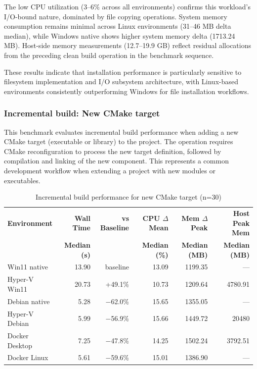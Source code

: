 The low CPU utilization (3--6\% across all environments) confirms this workload's I/O-bound nature, dominated by file copying operations.
System memory consumption remains minimal across Linux environments (31--46 MB delta median), while Windows native shows higher system memory delta (1713.24 MB).
Host-side memory measurements (12.7--19.9 GB) reflect residual allocations from the preceding clean build operation in the benchmark sequence.

These results indicate that installation performance is particularly sensitive to filesystem implementation and I/O subsystem architecture, with Linux-based environments consistently outperforming Windows for file installation workflows.

\subsubsection{Incremental build: New CMake target}
\label{subsec:incremental_new_target}

This benchmark evaluates incremental build performance when adding a new CMake target (executable or library) to the project.
The operation requires CMake reconfiguration to process the new target definition, followed by compilation and linking of the new component.
This represents a common development workflow when extending a project with new modules or executables.

\begin{table}[ht]
    \centering
    \footnotesize
    \begin{tabular}{|l|r|r|r|r|r|}
        \hline
        \textbf{Environment} & \textbf{Wall Time} & \textbf{vs Baseline} & \textbf{CPU $\Delta$ Mean} & \textbf{Mem $\Delta$ Peak} & \textbf{Host Peak Mem} \\
        & \textbf{Median (s)} & & \textbf{Median (\%)} & \textbf{Median (MB)} & \textbf{Median (MB)} \\
        \hline
        Win11 native & 13.90 & baseline & 13.09 & 1199.35 & --- \\
        Hyper-V Win11 & 20.73 & +49.1\% & 10.73 & 1209.64 & 4780.91 \\
        Debian native & 5.28 & $-$62.0\% & 15.65 & 1355.05 & --- \\
        Hyper-V Debian & 5.99 & $-$56.9\% & 15.66 & 1449.72 & 20480 \\
        Docker Desktop & 7.25 & $-$47.8\% & 14.25 & 1502.24 & 3792.51 \\
        Docker Linux & 5.61 & $-$59.6\% & 15.01 & 1386.90 & --- \\
        \hline
    \end{tabular}
    \caption{Incremental build performance for new CMake target (n=30)}
    \label{tab:cmake_build_incremental_feature_s2}
\end{table}

